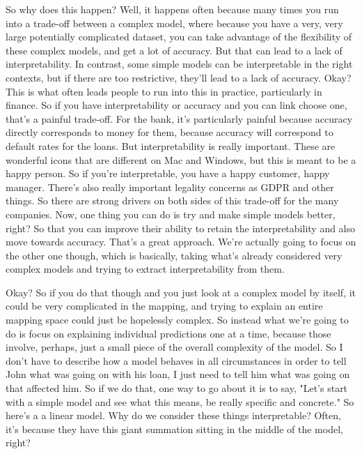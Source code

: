 So why does this happen? Well, it happens often because many times you run into a trade-off between a complex model,
where because you have a very, very large potentially complicated dataset, you can take advantage of the flexibility of these complex models,
and get a lot of accuracy. But that can lead to a lack of interpretability. In contrast, some simple models can be interpretable in the right contexts, but if there are too restrictive, they'll lead to a lack of accuracy.
Okay? This is what often leads people to run into this in practice, particularly in finance. So if you have interpretability
or accuracy and you can link choose one, that's a painful trade-off. For the bank, it's particularly painful because accuracy directly corresponds to money for them,
because accuracy will correspond to default rates for the loans. But interpretability is really important. These are wonderful icons that are different on Mac and Windows,
but this is meant to be a happy person. So if you're interpretable, you have a happy customer, happy manager.
There's also really important legality concerns as GDPR and other things. So there are strong drivers on both sides of this trade-off for the many companies. Now, one thing you can do is try and make simple models better, right? So that you can improve their ability to retain
the interpretability and also move towards accuracy. That's a great approach. We're actually going to focus on the other one though, which is basically,
taking what's already considered very complex models and trying to extract interpretability from them.

Okay? So if you do that though and you just look at a complex model by itself, it could be very complicated in the mapping,
and trying to explain an entire mapping space could just be hopelessly complex. So instead what we're going to do is focus on explaining individual predictions one at a time,
because those involve, perhaps, just a small piece of the overall complexity of the model. So I don't have to describe how a model behaves in all circumstances in order to tell John what was going on with his loan,
I just need to tell him what was going on that affected him. So if we do that, one way to go about it is to say, "Let's start with a simple model and see what this means,
be really specific and concrete." So here's a a linear model. Why do we consider these things interpretable?
Often, it's because they have this giant summation sitting in the middle of the model, right?

